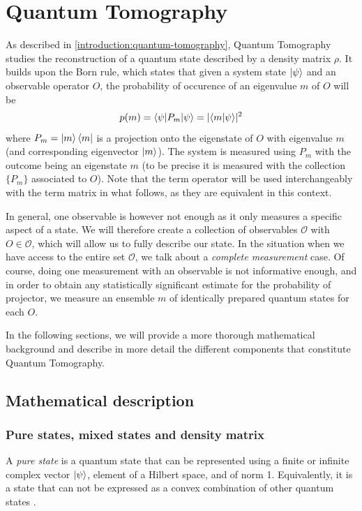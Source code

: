 \documentclass[12pt]{memoir}
\newcommand{\ti}{\textit}
\begin{document}
\section{Quantum Tomography}\label{section:quantum-tomography}
As described in \ref{introduction:quantum-tomography}, Quantum Tomography studies the reconstruction of a quantum state described by a density matrix $\rho$. It builds upon the Born rule, which states that given a system state $\ket \psi$ and an observable operator $O$, the probability of occurence of an eigenvalue $m$ of $O$ will be 
\begin{equation}
    p(m) = \braket{\psi | P_m| \psi} = \lvert\braket{m|\psi}\rvert^2
\end{equation}
where $P_m = \ket m \bra m$ is a projection onto the eigenstate of $O$ with eigenvalue $m$ (and corresponding eigenvector $\ket m$). The system is measured using $P_m$ with the outcome being an eigenstate $m$ (to be precise it is measured with the collection $\{P_m\}$ associated to $O$). Note that the term operator will be used interchangeably with the term matrix in what follows, as they are equivalent in this context.\medbreak

In general, one observable is however not enough as it only measures a specific aspect of a state. We will therefore create a collection of observables $\mathcal{O}$ with $O \in \mathcal{O}$, which will allow us to fully describe our state. In the situation when we have access to the entire set $\mathcal{O}$, we talk about a \ti{complete measurement} case. Of course, doing one measurement with an observable is not informative enough, and in order to obtain any statistically significant estimate for the probability of projector, we measure an ensemble $m$ of identically prepared quantum states for each $O$. \medbreak

In the following sections, we will provide a more thorough mathematical background and describe in more detail the different components that constitute Quantum Tomography.
\subsection{Mathematical description} \label{background:Quantum Tomography:math}

\subsubsection*{Pure states, mixed states and density matrix}
A \textit{pure state} is a quantum state that can be represented using a finite or infinite complex vector $\ket \psi$, element of a Hilbert space, and of norm 1. Equivalently, it is a state that can not be expressed as a convex combination of other quantum states \cite{wiki:density-matrix}.\medbreak
\end{document}
